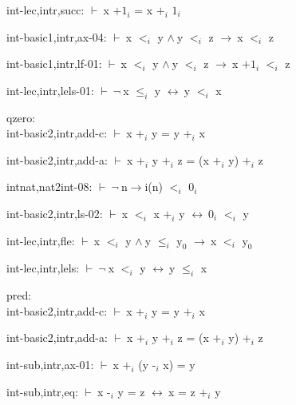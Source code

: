 \documentclass[a4paper]{article}
\newcommand{\Fol}{\mbox{$\vdash\ $}}
\newcommand{\Not}{\mbox{$\neg\ $}}
\newcommand{\And}{\mbox{$\wedge\ $}}
\newcommand{\Imp}{\mbox{$\rightarrow\ $}}
\newcommand{\Equiv}{\mbox{$\leftrightarrow\ $}}
\begin{document}
int-lec,intr,succ: 
 \Fol x $\mbox{+1}_{i}$ = x $\mbox{+}_{i}$ $\mbox{1}_{i}$



int-basic1,intr,ax-04: 
 \Fol x $\mbox{$<$}_{i}$ y \And y $\mbox{$<$}_{i}$ z \Imp x $\mbox{$<$}_{i}$ z



int-basic1,intr,lf-01: 
 \Fol x $\mbox{$<$}_{i}$ y \And y $\mbox{$<$}_{i}$ z \Imp x $\mbox{+1}_{i}$ $\mbox{$<$}_{i}$ z



int-lec,intr,lels-01: 
 \Fol \Not x $\mbox{$\le$}_{i}$ y \Equiv y $\mbox{$<$}_{i}$ x



\bigskip

qzero:\\ int-basic2,intr,add-c: 
 \Fol x $\mbox{+}_{i}$ y = y $\mbox{+}_{i}$ x



int-basic2,intr,add-a: 
 \Fol x $\mbox{+}_{i}$ y $\mbox{+}_{i}$ z = (x $\mbox{+}_{i}$ y) $\mbox{+}_{i}$ z



intnat,nat2int-08: 
 \Fol \Not n$\to$i(n) $\mbox{$<$}_{i}$ $\mbox{0}_{i}$



int-basic2,intr,ls-02: 
 \Fol x $\mbox{$<$}_{i}$ x $\mbox{+}_{i}$ y \Equiv $\mbox{0}_{i}$ $\mbox{$<$}_{i}$ y



int-lec,intr,fle: 
 \Fol x $\mbox{$<$}_{i}$ y \And y $\mbox{$\le$}_{i}$ $\mbox{y}_{0}$ \Imp x $\mbox{$<$}_{i}$ $\mbox{y}_{0}$



int-lec,intr,lels: 
 \Fol \Not x $\mbox{$<$}_{i}$ y \Equiv y $\mbox{$\le$}_{i}$ x



\bigskip

pred:\\ int-basic2,intr,add-c: 
 \Fol x $\mbox{+}_{i}$ y = y $\mbox{+}_{i}$ x



int-basic2,intr,add-a: 
 \Fol x $\mbox{+}_{i}$ y $\mbox{+}_{i}$ z = (x $\mbox{+}_{i}$ y) $\mbox{+}_{i}$ z



int-sub,intr,ax-01: 
 \Fol x $\mbox{+}_{i}$ (y $\mbox{-}_{i}$ x) = y



int-sub,intr,eq: 
 \Fol x $\mbox{-}_{i}$ y = z \Equiv x = z $\mbox{+}_{i}$ y
\end{document}
